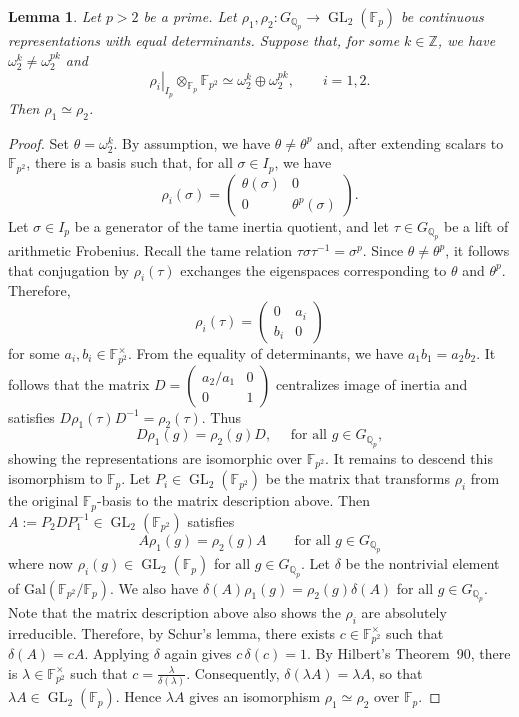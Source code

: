 \documentclass[12pt]{amsart}
\numberwithin{equation}{section}
\newtheorem{lemma}[equation]{Lemma}
\theoremstyle{definition}
\newcommand{\F}{\mathbb{F}}
\newcommand{\Q}{\mathbb{Q}}
\newcommand{\Z}{\mathbb{Z}}
\newcommand{\Gal}{\text{Gal}}
\DeclareMathOperator{\GL}{GL}
\begin{document}
\begin{lemma}\label{lem:niveau-two-representations}
Let $p > 2$ be a prime. Let
$\rho_1,\rho_2:G_{\Q_p}\longrightarrow \GL_2(\F_p)$
be continuous representations with equal determinants.
Suppose that, for some  $k \in \Z$, we have $\omega_2^k\neq\omega_2^{pk}$ and
\[
 \left.\rho_i\right|_{I_p}\otimes_{\F_p}\F_{p^2}
 \simeq
 \omega_2^k\oplus\omega_2^{pk},
 \qquad i=1,2.
\]
Then $\rho_1\simeq\rho_2$.
\end{lemma}

\begin{proof}
Set $\theta=\omega_2^k$. By assumption, we have $\theta\neq\theta^p$ and, after extending scalars to $\F_{p^2}$, there is a basis such that, for all $\sigma \in I_p$, we have
\[
 \rho_i(\sigma)=
 \begin{pmatrix}
  \theta(\sigma)&0\\
  0&\theta^p(\sigma)
 \end{pmatrix}.
\]
Let $\sigma\in I_p$ be a generator of the tame inertia
quotient, and let $\tau\in G_{\Q_p}$ be a lift of arithmetic
Frobenius. Recall the tame relation
$\tau\sigma\tau^{-1}=\sigma^p$. Since $\theta \neq \theta^p$, it follows that conjugation by $\rho_i(\tau)$ exchanges the 
eigenspaces corresponding to $\theta$ and $\theta^p$. Therefore,
\[
 \rho_i(\tau)=
 \begin{pmatrix}
  0&a_i\\
  b_i&0
 \end{pmatrix}
\]
for some $a_i,b_i\in\F_{p^2}^{\times}$. From the equality of determinants, we have $a_1b_1=a_2b_2$.
It follows that the matrix
$
 D=\left(
 \begin{smallmatrix}
  a_2/a_1&0\\
  0&1
 \end{smallmatrix}\right)
$ 
centralizes image of inertia and satisfies
$D\rho_1(\tau)D^{-1}=\rho_2(\tau)$.
Thus
\[
 D\rho_1(g) =  \rho_2(g) D, \quad \text{ for all } g \in G_{\Q_p},
\]
showing the representations are isomorphic over $\F_{p^2}$.
It remains to descend this isomorphism to $\F_p$. 
Let $P_i\in\GL_2(\F_{p^2})$ be the matrix that transforms $\rho_i$ from the original
$\F_p$-basis to the matrix description above. Then
 $A:=P_2DP_1^{-1}\in\GL_2(\F_{p^2})$ satisfies
\[
 A\rho_1(g)=\rho_2(g)A
 \qquad\text{for all }g\in G_{\Q_p}
\]
where now $\rho_i(g) \in \GL_2(\F_p)$ for all $g \in G_{\Q_p}$.
Let $\delta$ be the nontrivial element of
$\Gal(\F_{p^2}/\F_p)$. We also have  $\delta(A)\rho_1(g)=\rho_2(g)\delta(A)$ 
for all $g\in G_{\Q_p}$. 
Note that the matrix description above also shows the $\rho_i$ are absolutely irreducible. Therefore, by Schur's
lemma, there exists $c\in\F_{p^2}^{\times}$ such that
$\delta(A)=cA$. Applying $\delta$ again gives
$c\,\delta(c)=1$. By Hilbert's Theorem~90, there is
$\lambda\in\F_{p^2}^{\times}$ such that
$c=\frac{\lambda}{\delta(\lambda)}$.
Consequently,
$\delta(\lambda A)=\lambda A$,
so that $\lambda A\in\GL_2(\F_p)$. Hence $\lambda A$ gives an
isomorphism $\rho_1\simeq\rho_2$ over $\F_p$.
\end{proof}
\end{document}
